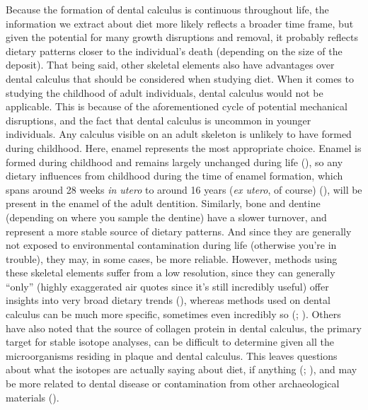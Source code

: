 \documentclass[
  b5paper,
]{book}
\begin{document}
Because the formation of dental calculus is continuous throughout life,
the information we extract about diet more likely reflects a broader
time frame, but given the potential for many growth disruptions and
removal, it probably reflects dietary patterns closer to the
individual's death (depending on the size of the deposit). That being
said, other skeletal elements also have advantages over dental calculus
that should be considered when studying diet. When it comes to studying
the childhood of adult individuals, dental calculus would not be
applicable. This is because of the aforementioned cycle of potential
mechanical disruptions, and the fact that dental calculus is uncommon in
younger individuals. Any calculus visible on an adult skeleton is
unlikely to have formed during childhood. Here, enamel represents the
most appropriate choice. Enamel is formed during childhood and remains
largely unchanged during life
(), so any
dietary influences from childhood during the time of enamel formation,
which spans around 28 weeks \emph{in utero} to around 16 years (\emph{ex
utero}, of course)
(), will be
present in the enamel of the adult dentition. Similarly, bone and
dentine (depending on where you sample the dentine) have a slower
turnover, and represent a more stable source of dietary patterns. And
since they are generally not exposed to environmental contamination
during life (otherwise you're in trouble), they may, in some cases, be
more reliable. However, methods using these skeletal elements suffer
from a low resolution, since they can generally ``only'' (highly
exaggerated air quotes since it's still incredibly useful) offer
insights into very broad dietary trends
(), whereas
methods used on dental calculus can be much more specific, sometimes
even incredibly so (; ).
Others have also noted that the source of collagen protein in dental
calculus, the primary target for stable isotope analyses, can be
difficult to determine given all the microorganisms residing in plaque
and dental calculus. This leaves questions about what the isotopes are
actually saying about diet, if anything
(;
), and may be more related to dental disease or contamination from
other archaeological materials
().
\end{document}
